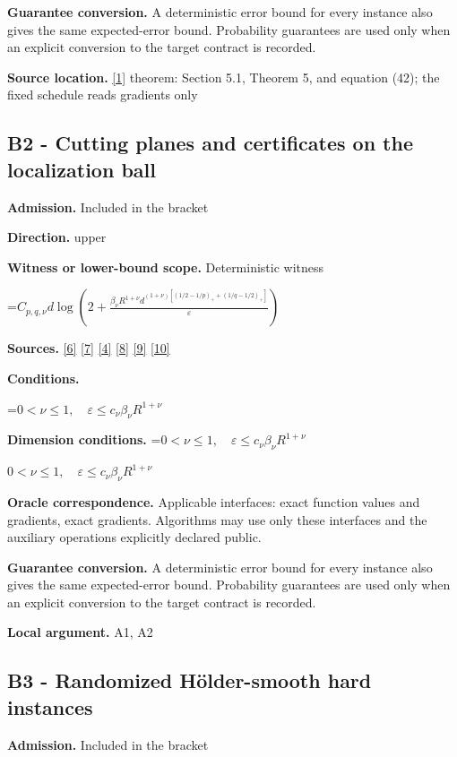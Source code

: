 \documentclass[10pt,a4paper]{article}
\newcommand{\AtlasMath}[1]{\par\begingroup\centering\setbox0=\hbox{$\displaystyle #1$}\ifdim\wd0>1.4\linewidth\typeout{ATLAS WIDE FORMULA: \the\wd0}\fi\ifdim\wd0>\linewidth\resizebox{\linewidth}{!}{\box0}\else\box0\fi\par\endgroup}
\newcommand{\AtlasInlineMath}[1]{\begingroup\setbox0=\hbox{$#1$}\ifdim\wd0>.4\linewidth\endgroup\AtlasMath{#1}\else\endgroup$#1$\fi}
\begin{document}
\textbf{Guarantee conversion.} A deterministic error bound for every instance also gives the same expected-error bound. Probability guarantees are used only when an explicit conversion to the target contract is recorded.

\textbf{Source location.} \href{https://optimization-online.org/wp-content/uploads/2010/12/2865.pdf}{[1]} theorem: Section 5.1, Theorem 5, and equation (42); the fixed schedule reads gradients only

\subsection{B2 - Cutting planes and certificates on the localization ball}
\textbf{Admission.} Included in the bracket

\textbf{Direction.} upper

\textbf{Witness or lower-bound scope.} Deterministic witness

\AtlasMath{C_{p,q,\nu}d\log\left(2+\frac{\beta_\nu R^{1+\nu}d^{(1+\nu)[(1/2-1/p)_++(1/q-1/2)_+]}}{\varepsilon}\right)}
\textbf{Sources.} \href{https://arxiv.org/pdf/2101.09740v2}{[6]} \href{https://arxiv.org/pdf/2609.33360v2}{[7]} \href{https://arxiv.org/pdf/2609.10874}{[4]} \href{https://arxiv.org/pdf/1405.4980}{[8]} \href{https://www2.isye.gatech.edu/~nemirovs/MOR_AccuracyCertificates.pdf}{[9]} \href{https://arxiv.org/pdf/2609.20701}{[10]}

\textbf{Conditions.} 
\AtlasMath{0<\nu\le1,\quad\varepsilon\le c_\nu\beta_\nu R^{1+\nu}}


\textbf{Dimension conditions.} \AtlasInlineMath{0<\nu\le1,\quad\varepsilon\le c_\nu\beta_\nu R^{1+\nu}}

\textbf{Oracle correspondence.} Applicable interfaces: exact function values and gradients, exact gradients. Algorithms may use only these interfaces and the auxiliary operations explicitly declared public.

\textbf{Guarantee conversion.} A deterministic error bound for every instance also gives the same expected-error bound. Probability guarantees are used only when an explicit conversion to the target contract is recorded.

\textbf{Local argument.} A1, A2

\subsection{B3 - Randomized Hölder-smooth hard instances}
\textbf{Admission.} Included in the bracket
\end{document}
